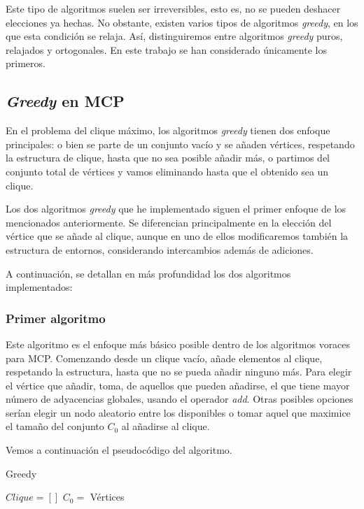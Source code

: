 Este tipo de algoritmos suelen ser irreversibles, esto es, no se pueden deshacer elecciones ya hechas.
No obstante, existen varios tipos de algoritmos \textit{greedy}, en los que esta condición se relaja. Así,
distinguiremos entre algoritmos \textit{greedy} puros, relajados y ortogonales. En este trabajo se han
considerado únicamente los primeros.

\subsection{\textit{Greedy} en MCP}

En el problema del clique máximo, los algoritmos \textit{greedy} tienen dos enfoque principales:
o bien se parte de un conjunto vacío y se añaden vértices, respetando la estructura de clique,
hasta que no sea posible añadir más, o partimos del conjunto total de vértices y vamos eliminando
hasta que el obtenido sea un clique.

Los dos algoritmos \textit{greedy} que he implementado siguen el primer enfoque de los mencionados anteriormente.
Se diferencian principalmente en la elección del vértice que se añade al clique, aunque en uno de ellos modificaremos
también la estructura de entornos, considerando intercambios además de adiciones.

A continuación, se detallan en más profundidad los dos algoritmos implementados:

\subsubsection{Primer algoritmo}

Este algoritmo es el enfoque más básico posible dentro de los algoritmos voraces para MCP.
Comenzando desde un clique vacío, añade elementos al clique, respetando la estructura, hasta
que no se pueda añadir ninguno más. Para elegir el vértice que añadir, toma, de aquellos que
pueden añadirse, el que tiene mayor número de adyacencias globales, usando el operador \textit{add}.
Otras posibles opciones serían elegir un nodo aleatorio entre los disponibles o tomar aquel que
maximice el tamaño del conjunto $C_0$ al añadirse al clique.

Vemos a continuación el pseudocódigo del algoritmo.

\begin{algorithm}[H]
\caption{Greedy}
  \begin{algorithmic}
  \State $Clique = [ ]$
  \State $C_0 = $ Vértices
  \Repeat
  \end{algorithmic}
\end{algorithm}


